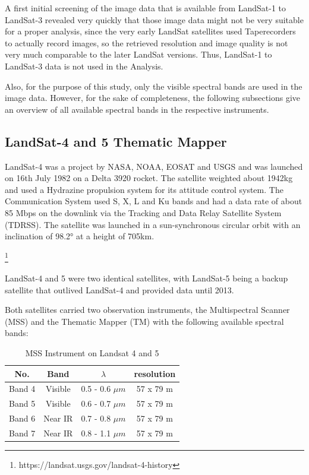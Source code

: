 A first initial screening of the image data that is available from LandSat-1 to LandSat-3 revealed very quickly that those image data might not be very suitable for a proper analysis, since the very early LandSat satellites used Taperecorders to actually record images, so the retrieved resolution and image quality is not very much comparable to the later LandSat versions. Thus, LandSat-1 to LandSat-3 data is not used in the Analysis.

Also, for the purpose of this study, only the visible spectral bands are used in the image data. However, for the sake of completeness, the following subsections give an overview of all available spectral bands in the respective instruments.

\subsection{LandSat-4 and 5 Thematic Mapper}
LandSat-4 was a project by NASA, NOAA, EOSAT and USGS and was launched on 16th July 1982 on a Delta 3920 rocket. The satellite weighted about 1942kg and used a Hydrazine propulsion system for its attitude control system. The Communication System used S, X, L and  Ku bands and had a data rate of about 85 Mbps on the downlink via the Tracking and Data Relay Satellite System (TDRSS). The satellite was launched in a sun-synchronous circular orbit with an inclination of 98.2° at a height of 705km.

\footnote{https://landsat.usgs.gov/landsat-4-history}

LandSat-4 and 5 were two identical satellites, with LandSat-5 being a backup satellite that outlived LandSat-4 and provided data until 2013.

Both satellites carried two observation instruments, the Multispectral Scanner (MSS) and the Thematic Mapper (TM) with the following available spectral bands:

\begin{table} [h!]
	\centering
	\begin{tabular}{ | c | c | c | c |}
	\hline
	\textbf{No.} & \textbf{Band} & \textbf{$\lambda$} & \textbf{resolution} \\
	\hline
	Band 4 & Visible & 0.5 - 0.6 $\mu m$ & {57 x 79 m} \\
	Band 5 & Visible & 0.6 - 0.7 $\mu m$ & {57 x 79 m} \\
	Band 6 & Near IR & 0.7 - 0.8 $\mu m$ & {57 x 79 m} \\
	Band 7 & Near IR & 0.8 - 1.1 $\mu m$ & {57 x 79 m} \\
	\hline
	\end{tabular}
	\caption{MSS Instrument on Landsat 4 and 5}
	\label{tab:L45MSS}
\end{table}

